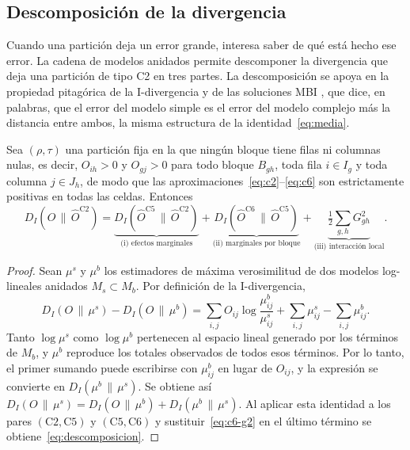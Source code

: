 \subsection{Descomposición de la divergencia}\label{sec:descomposicion}

Cuando una partición deja un error grande, interesa saber de qué está hecho ese
error. La cadena de modelos anidados permite descomponer la divergencia que deja
una partición de tipo C2 en tres partes. La descomposición se apoya en la
propiedad pitagórica de la I-divergencia \citep{Csiszar1975} y de las soluciones
MBI \citep[Lema~3]{Banerjee2007}, que dice, en palabras, que el error del modelo
simple es el error del modelo complejo más la distancia entre ambos, la misma
estructura de la identidad~\eqref{eq:media}.

\begin{proposicion}\label{prop:descomposicion}
Sea $(\rho,\tau)$ una partición fija en la que ningún bloque tiene filas ni
columnas nulas, es decir, $O_{ih} > 0$ y $O_{gj} > 0$ para todo bloque $B_{gh}$,
toda fila $i \in I_g$ y toda columna $j \in J_h$, de modo que las
aproximaciones~\eqref{eq:c2}--\eqref{eq:c6} son estrictamente positivas en todas
las celdas. Entonces
\begin{equation}\label{eq:descomposicion}
  D_I\!\left(O \,\|\, \hat{O}^{\mathrm{C2}}\right)
  = \underbrace{D_I\!\left(\hat{O}^{\mathrm{C5}} \,\|\, \hat{O}^{\mathrm{C2}}\right)}_{\text{(i) efectos marginales}}
  + \underbrace{D_I\!\left(\hat{O}^{\mathrm{C6}} \,\|\, \hat{O}^{\mathrm{C5}}\right)}_{\text{(ii) marginales por bloque}}
  + \underbrace{\tfrac{1}{2} \textstyle\sum_{g,h} G^2_{gh}}_{\text{(iii) interacción local}} .
\end{equation}
\end{proposicion}

\begin{proof}
Sean $\mu^s$ y $\mu^b$ los estimadores de máxima
verosimilitud de dos modelos log-lineales anidados $M_s \subset M_b$. Por
definición de la I-divergencia,
\[
  D_I(O \,\|\, \mu^s) - D_I(O \,\|\, \mu^b)
  = \sum_{i,j} O_{ij} \log \frac{\mu^b_{ij}}{\mu^s_{ij}}
  + \sum_{i,j} \mu^s_{ij} - \sum_{i,j} \mu^b_{ij}.
\]
Tanto $\log \mu^s$ como $\log \mu^b$ pertenecen al espacio lineal generado por los
términos de $M_b$, y $\mu^b$ reproduce los totales observados de todos esos
términos. Por lo tanto, el primer sumando puede escribirse con $\mu^b_{ij}$ en
lugar de $O_{ij}$, y la expresión se convierte en $D_I(\mu^b \,\|\, \mu^s)$. Se
obtiene así
$D_I(O \,\|\, \mu^s) = D_I(O \,\|\, \mu^b) + D_I(\mu^b \,\|\, \mu^s)$. Al aplicar
esta identidad a los pares $(\mathrm{C2}, \mathrm{C5})$ y
$(\mathrm{C5}, \mathrm{C6})$ y sustituir~\eqref{eq:c6-g2} en el último término se
obtiene~\eqref{eq:descomposicion}.
\end{proof}

